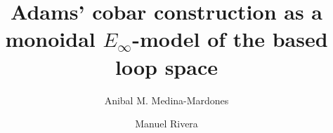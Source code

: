 \documentclass{amsart}
\title[Adams' cobar construction as a monoidal $E_{\infty}$-model]{Adams' cobar construction as a monoidal $E_{\infty}$-model of the based loop space}
\author[A. Medina-Mardones]{Anibal M. Medina-Mardones}
\author[M. Rivera]{Manuel Rivera}
\begin{document}
	
	\maketitle
	\tableofcontents
%	
	
	
%	
%	
	
	
	
%	
	\sloppy
    \printbibliography
\end{document}
